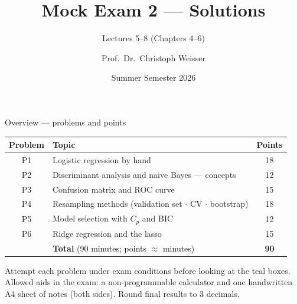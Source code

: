 \documentclass[aspectratio=169,11pt]{beamer}
\title{Mock Exam 2 --- Solutions}
\subtitle{Lectures 5--8 (Chapters 4--6)}
\author{Prof.\ Dr.\ Christoph Weisser}\institute{Quantitative Research Methods \textperiodcentered\ HSBI}
\date{Summer Semester 2026}
\begin{document}
\begin{frame}[plain]\titlepage\end{frame}

\begin{frame}{Overview --- problems and points}
  \footnotesize
  \begin{center}
  \begin{tabular}{@{}clc@{}}
    \toprule
    \textbf{Problem} & \textbf{Topic} & \textbf{Points}\\
    \midrule
    P1 & Logistic regression by hand & 18\\
    P2 & Discriminant analysis and naive Bayes --- concepts & 12\\
    P3 & Confusion matrix and ROC curve & 15\\
    P4 & Resampling methods (validation set $\cdot$ CV $\cdot$ bootstrap) & 18\\
    P5 & Model selection with $C_p$ and BIC & 12\\
    P6 & Ridge regression and the lasso & 15\\
    \midrule
     & \textbf{Total} \quad (90 minutes; points $\approx$ minutes) & \textbf{90}\\
    \bottomrule
  \end{tabular}
  \end{center}
  \vspace{1mm}
  \begin{takeaway}
    Attempt each problem under exam conditions before looking at the teal boxes.
    Allowed aids in the exam: a non-programmable calculator and one handwritten A4 sheet
    of notes (both sides). Round final results to 3 decimals.
  \end{takeaway}
\end{frame}
\end{document}
